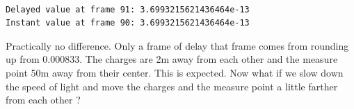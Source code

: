 \documentclass[11pt]{article}
\begin{document}
    \begin{center}
    \end{center}
    { \hspace*{\fill} \\}
    
    \begin{Verbatim}[commandchars=\\\{\}]
Delayed value at frame 91: 3.6993215621436464e-13
Instant value at frame 90: 3.6993215621436464e-13
    \end{Verbatim}

    Practically no difference. Only a frame of delay that frame comes from
rounding up from 0.000833. The charges are 2m away from each other and
the measure point 50m away from their center. This is expected. Now what
if we slow down the speed of light and move the charges and the measure
point a little farther from each other ?
\end{document}
